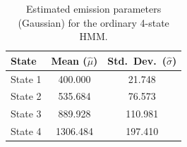 \begin{table}[ht]
\centering
\begin{tabular}{lcc}
\hline
State & Mean ($\hat{\mu}$) & Std.\ Dev.\ ($\hat{\sigma}$) \\
\hline
State 1 & 400.000 & 21.748 \\
State 2 & 535.684 & 76.573 \\
State 3 & 889.928 & 110.981 \\
State 4 & 1306.484 & 197.410 \\
\hline
\end{tabular}
\caption{Estimated emission parameters (Gaussian) for the ordinary 4-state HMM.}
\label{tab:ordinary_hmm_emissions}
\end{table}
